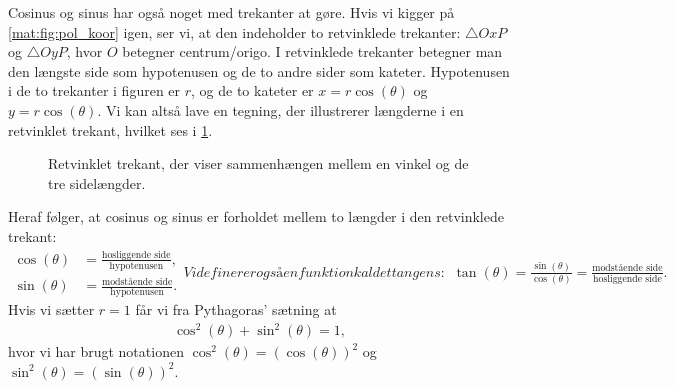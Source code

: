 Cosinus og sinus har også noget med trekanter at gøre. Hvis vi kigger på \cref{mat:fig:pol_koor} igen, ser vi, at den indeholder to retvinklede trekanter: $\bigtriangleup OxP$ og $\bigtriangleup OyP$, hvor $O$ betegner centrum/origo. I retvinklede trekanter betegner man den længste side som hypotenusen og de to andre sider som kateter. Hypotenusen i de to trekanter i figuren er $r$, og de to kateter er $x = r \cos(\theta)$ og $y = r \cos(\theta)$. Vi kan altså lave en tegning, der illustrerer længderne i en retvinklet trekant, hvilket ses i \cref{mat:fig:trekant}.
%
\begin{figure}
    \centering
    \caption{Retvinklet trekant, der viser sammenhængen mellem en vinkel og de tre sidelængder.}
    \label{mat:fig:trekant}
\end{figure}
%
Heraf følger, at cosinus og sinus er forholdet mellem to længder i den retvinklede trekant:
%
\begin{subequations} \label{mat:eq:trig}
\begin{align}
    \cos(\theta) &= \frac{\text{hosliggende side}}{\text{hypotenusen}}, \label{mat:eq:cos} \\
    \sin(\theta) &= \frac{\text{modstående side}}{\text{hypotenusen}}. \label{mat:eq:sin}
\end{align}
%
Vi definerer også en funktion kaldet tangens:
%
\begin{align}
    \tan(\theta) = \frac{\sin(\theta)}{\cos(\theta)} = \frac{\text{modstående side}}{\text{hosliggende side}}. \label{mat:eq:tan}
\end{align}
\end{subequations}
%
Hvis vi sætter $r=1$ får vi fra Pythagoras' sætning at
%
\begin{align}
    \cos^2 (\theta) + \sin^2 (\theta) = 1,
\end{align}
%
hvor vi har brugt notationen $\cos^2 (\theta) = (\cos(\theta))^2$ og
$\sin^2 (\theta) = (\sin(\theta))^2$.